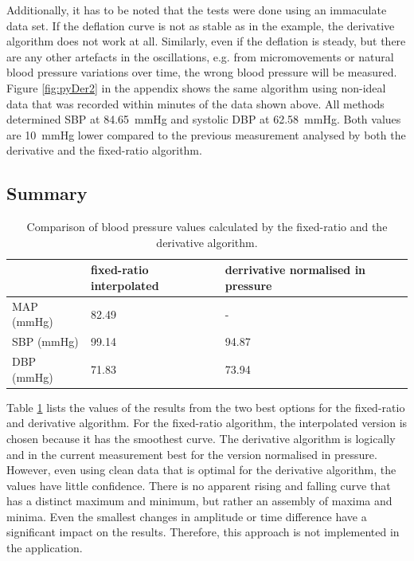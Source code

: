 Additionally, it has to be noted that the tests were done using an immaculate data set. If the deflation curve is not as stable as in the example, the derivative algorithm does not work at all. Similarly, even if the deflation is steady, but there are any other artefacts in the oscillations, e.g. from micromovements or natural blood pressure variations over time, the wrong blood pressure will be measured. Figure \ref{fig:pyDer2} in the appendix shows the same algorithm using non-ideal data that was recorded within minutes of the data shown above. All methods determined  SBP at \SI{84.65}{\mmHg} and systolic DBP at \SI{62.58}{mmHg}. Both values are \SI{10}{mmHg} lower compared to the previous measurement analysed by both the derivative and the fixed-ratio algorithm. 


\subsection{Summary}

\begin{table}[ht]\label{tbl:sumPy}
\centering
\begin{tabular}{lll}
\hline
           & fixed-ratio interpolated & derrivative normalised in pressure\\ \hline
MAP (mmHg) & 82.49       & -           \\ \hline
SBP (mmHg) & 99.14       & 94.87       \\ \hline
DBP (mmHg) & 71.83       & 73.94       \\ \hline
\end{tabular}
\caption{Comparison of blood pressure values calculated by the fixed-ratio and the derivative algorithm.}
\end{table}


Table \ref{tbl:sumPy} lists the values of the results from the two best options for the fixed-ratio and derivative algorithm. For the fixed-ratio algorithm, the interpolated version is chosen because it has the smoothest curve. The derivative algorithm is logically and in the current measurement best for the version normalised in pressure. However, even using clean data that is optimal for the derivative algorithm, the values have little confidence.  There is no apparent rising and falling curve that has a distinct maximum and minimum, but rather an assembly of maxima and minima. Even the smallest changes in amplitude or time difference have a significant impact on the results. Therefore, this approach is not implemented in the application.

